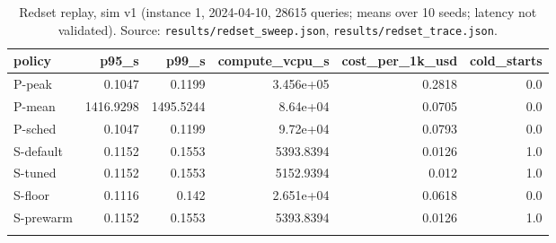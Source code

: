 \begin{table}[htbp]
\centering
\footnotesize
\caption{Redset replay, sim v1 (instance 1, 2024-04-10, 28615 queries; means over 10 seeds; latency not validated). Source: \texttt{results/redset\_sweep.json}, \texttt{results/redset\_trace.json}.}
\label{tab:redsetv1}
\setlength{\tabcolsep}{3pt}
\begin{tabular}{lrrrrr}
\toprule
\textbf{policy} & \textbf{p95\_s} & \textbf{p99\_s} & \textbf{compute\_vcpu\_s} & \textbf{cost\_per\_1k\_usd} & \textbf{cold\_starts} \\
\midrule
P-peak & 0.1047 & 0.1199 & 3.456e+05 & 0.2818 & 0.0 \\
P-mean & 1416.9298 & 1495.5244 & 8.64e+04 & 0.0705 & 0.0 \\
P-sched & 0.1047 & 0.1199 & 9.72e+04 & 0.0793 & 0.0 \\
S-default & 0.1152 & 0.1553 & 5393.8394 & 0.0126 & 1.0 \\
S-tuned & 0.1152 & 0.1553 & 5152.9394 & 0.012 & 1.0 \\
S-floor & 0.1116 & 0.142 & 2.651e+04 & 0.0618 & 0.0 \\
S-prewarm & 0.1152 & 0.1553 & 5393.8394 & 0.0126 & 1.0 \\
\botrule
\end{tabular}
\end{table}
